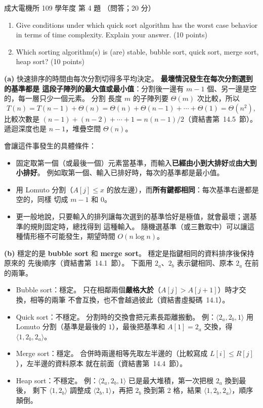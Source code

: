 \begin{pastexam}[label={px:ncku-109-ee-ds-04}]{成大電機所 109 學年度 第 4 題}
（問答；20 分）

\begin{enumerate}[label=(\alph*)]
\item Give conditions under which quick sort algorithm has the worst case behavior in terms of time
complexity. Explain your answer. (10 points)
\item Which sorting algorithm(s) is (are) stable, bubble sort, quick sort, merge sort, heap sort?
\quad (10 points)
\end{enumerate}
\end{pastexam}

\begin{pastsoln}
\textbf{(a)} 快速排序的時間由每次分割切得多平均決定。 \textbf{最壞情況發生在每次分割選到的基準都是
這段子陣列的最大值或最小值}：分割後一邊有 $m - 1$ 個、另一邊是空的，每一層只少一個元素。 分割
長度 $m$ 的子陣列要 $\Theta(m)$ 次比較，所以
\[
T(n) = T(n - 1) + \Theta(n) = \Theta(n) + \Theta(n - 1) + \cdots + \Theta(1) = \Theta(n^2),
\]
比較次數是 $(n - 1) + (n - 2) + \cdots + 1 = n(n - 1)/2$（資結書第~14.5~節）。 遞迴深度也是
$n - 1$，堆疊空間 $\Theta(n)$。

會讓這件事發生的具體條件：
\begin{itemize}
\item 固定取第一個（或最後一個）元素當基準，而輸入\textbf{已經由小到大排好}或\textbf{由大到小排好}。
例如取第一個、輸入已排好時，每次的基準都是最小值。
\item 用 Lomuto 分割（$A[j] \le x$ 的放左邊），而\textbf{所有鍵都相同}：每次基準右邊都是空的，同樣
切成 $m - 1$ 和 $0$。
\item 更一般地說，只要輸入的排列讓每次選到的基準恰好是極值，就會最壞；選基準的規則固定時，總找得到
這種輸入。 隨機選基準（或三數取中）可以讓這種情形極不可能發生，期望時間 $O(n \log n)$。
\end{itemize}

\textbf{(b)} 穩定的是 \textbf{bubble sort} 和 \textbf{merge sort}。 穩定是指鍵相同的資料排序後保持原來的
先後順序（資結書第~14.1~節）。 下面用 $2_a$、$2_b$ 表示鍵相同、原本 $2_a$ 在前的兩筆。
\begin{itemize}
\item Bubble sort：穩定。 只在相鄰兩個\textbf{嚴格大於}（$A[j] > A[j + 1]$）時才交換，相等的兩筆
不會互換，也不會越過彼此（資結書虛擬碼~14.1）。
\item Quick sort：不穩定。 分割時的交換會把元素長距離搬動。 例：$\langle 2_a, 2_b, 1\rangle$ 用
Lomuto 分割（基準是最後的 $1$），最後把基準和 $A[1] = 2_a$ 交換，得 $\langle 1, 2_b, 2_a\rangle$。
\item Merge sort：穩定。 合併時兩邊相等先取左半邊的（比較寫成 $L[i] \le R[j]$），左半邊的資料原本
就在前面（資結書第~14.4~節）。
\item Heap sort：不穩定。 例：$\langle 2_a, 2_b, 1\rangle$ 已是最大堆積，第一次把根 $2_a$ 換到最後，
剩下 $\langle 1, 2_b\rangle$ 調整成 $\langle 2_b, 1\rangle$，再把 $2_b$ 換到第 2 格，結果
$\langle 1, 2_b, 2_a\rangle$，順序顛倒。
\end{itemize}
\end{pastsoln}
